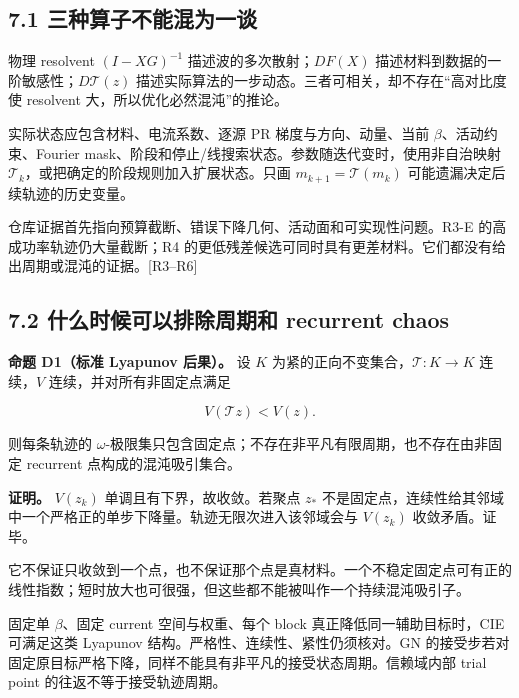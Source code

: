 \documentclass[11pt,a4paper]{article}
\begin{document}
\hypertarget{ux4e09ux79cdux7b97ux5b50ux4e0dux80fdux6df7ux4e3aux4e00ux8c08}{%
\subsection{7.1
三种算子不能混为一谈}\label{ux4e09ux79cdux7b97ux5b50ux4e0dux80fdux6df7ux4e3aux4e00ux8c08}}

物理 resolvent \((I-XG)^{-1}\) 描述波的多次散射；\(DF(X)\)
描述材料到数据的一阶敏感性；\(D\mathcal T(z)\)
描述实际算法的一步动态。三者可相关，却不存在``高对比度使 resolvent
大，所以优化必然混沌''的推论。

实际状态应包含材料、电流系数、逐源 PR 梯度与方向、动量、当前
\(\beta\)、活动约束、Fourier
mask、阶段和停止/线搜索状态。参数随迭代变时，使用非自治映射
\(\mathcal T_k\)，或把确定的阶段规则加入扩展状态。只画
\(m_{k+1}=\mathcal T(m_k)\) 可能遗漏决定后续轨迹的历史变量。

仓库证据首先指向预算截断、错误下降几何、活动面和可实现性问题。R3-E
的高成功率轨迹仍大量截断；R4
的更低残差候选可同时具有更差材料。它们都没有给出周期或混沌的证据。{[}R3--R6{]}

\hypertarget{ux4ec0ux4e48ux65f6ux5019ux53efux4ee5ux6392ux9664ux5468ux671fux548c-recurrent-chaos}{%
\subsection{7.2 什么时候可以排除周期和 recurrent
chaos}\label{ux4ec0ux4e48ux65f6ux5019ux53efux4ee5ux6392ux9664ux5468ux671fux548c-recurrent-chaos}}

\textbf{命题 D1（标准 Lyapunov 后果）。} 设 \(K\)
为紧的正向不变集合，\(\mathcal T:K\to K\) 连续，\(V\)
连续，并对所有非固定点满足

\[
V(\mathcal Tz)<V(z).
\]

则每条轨迹的
\(\omega\)-极限集只包含固定点；不存在非平凡有限周期，也不存在由非固定
recurrent 点构成的混沌吸引集合。

\textbf{证明。} \(V(z_k)\) 单调且有下界，故收敛。若聚点 \(z_*\)
不是固定点，连续性给其邻域中一个严格正的单步下降量。轨迹无限次进入该邻域会与
\(V(z_k)\) 收敛矛盾。证毕。

它不保证只收敛到一个点，也不保证那个点是真材料。一个不稳定固定点可有正的线性指数；短时放大也可很强，但这些都不能被叫作一个持续混沌吸引子。

固定单 \(\beta\)、固定 current 空间与权重、每个 block
真正降低同一辅助目标时，CIE 可满足这类 Lyapunov
结构。严格性、连续性、紧性仍须核对。GN
的接受步若对固定原目标严格下降，同样不能具有非平凡的接受状态周期。信赖域内部
trial point 的往返不等于接受轨迹周期。
\end{document}
